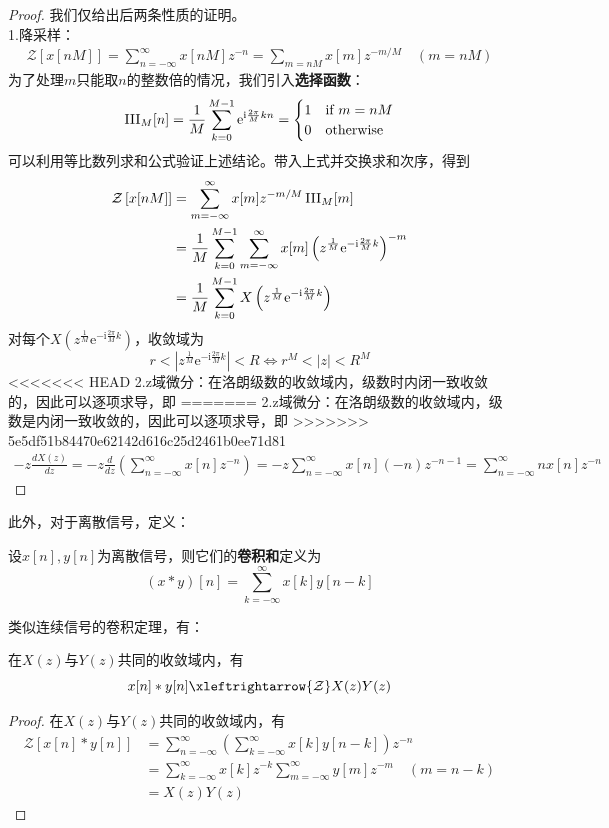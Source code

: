 \begin{proof}
    我们仅给出后两条性质的证明。\\
    1.降采样：
    \begin{align*}
        \mathcal{Z}\left[x[nM]\right]=\sum_{n=-\infty}^{\infty}x[nM]z^{-n}=\sum_{m=nM}x[m]z^{-m/M}\quad(m=nM)
    \end{align*}
    为了处理$m$只能取$n$的整数倍的情况，我们引入\textbf{选择函数}：
    \[\operatorname{III}_M[n]=\frac{1}{M}\sum_{k=0}^{M-1}\mathrm{e}^{\mathrm{i}\frac{2\pi}{M}kn}=\begin{cases}
        1 & \text{if }m=nM\\
        0 & \text{otherwise}
    \end{cases}\]
    可以利用等比数列求和公式验证上述结论。带入上式并交换求和次序，得到
    \begin{align*}
        \mathcal{Z}\left[x[nM]\right]&=\sum_{m=-\infty}^{\infty}x[m]z^{-m/M}\operatorname{III}_M[m]\\
        &=\frac{1}{M}\sum_{k=0}^{M-1}\sum_{m=-\infty}^{\infty}x[m]\left(z^{\frac{1}{M}}\mathrm{e}^{-\mathrm{i}\frac{2\pi}{M}k}\right)^{-m}\\
        &=\frac{1}{M}\sum_{k=0}^{M-1}X\left(z^{\frac{1}{M}}\mathrm{e}^{-\mathrm{i}\frac{2\pi}{M}k}\right)
    \end{align*}
    对每个$X\left(z^{\frac{1}{M}}\mathrm{e}^{-\mathrm{i}\frac{2\pi}{M}k}\right)$，收敛域为
    \[r<\left|z^{\frac{1}{M}}\mathrm{e}^{-\mathrm{i}\frac{2\pi}{M}k}\right|< R\iff r^{M}<|z|<R^{M}\]
<<<<<<< HEAD
    2.z域微分：在洛朗级数的收敛域内，级数时内闭一致收敛的，因此可以逐项求导，即
=======
    2.z域微分：在洛朗级数的收敛域内，级数是内闭一致收敛的，因此可以逐项求导，即
>>>>>>> 5e5df51b84470e62142d616c25d2461b0ee71d81
    \begin{align*}
        -z\frac{dX(z)}{dz}=-z\frac{d}{dz}\left(\sum_{n=-\infty}^{\infty}x[n]z^{-n}\right)=-z\sum_{n=-\infty}^{\infty}x[n](-n)z^{-n-1}=\sum_{n=-\infty}^{\infty}n x[n]z^{-n}
    \end{align*}
\end{proof}

此外，对于离散信号，定义\cite{signal_systems}：
\begin{definition}[卷积和]
    设$x[n],y[n]$为离散信号，则它们的\textbf{卷积和}定义为
    \[(x*y)[n]=\sum_{k=-\infty}^{\infty}x[k]y[n-k]\]
\end{definition}
类似连续信号的卷积定理，有：
\begin{proposition}[卷积和定理]
    在$X(z)$与$Y(z)$共同的收敛域内，有
    \[x[n]*y[n]\xleftrightarrow{\mathcal{Z}} X(z)Y(z)\]
\end{proposition}
\begin{proof}
    在$X(z)$与$Y(z)$共同的收敛域内，有
    \begin{align*}
        \mathcal{Z} \left[x[n]*y[n]\right]&=\sum_{n=-\infty}^{\infty}\left(\sum_{k=-\infty}^{\infty}x[k]y[n-k]\right)z^{-n}\\
        &=\sum_{k=-\infty}^{\infty}x[k]z^{-k}\sum_{m=-\infty}^{\infty}y[m]z^{-m}\quad(m=n-k)\\
        &=X(z)Y(z)
    \end{align*}
\end{proof}

